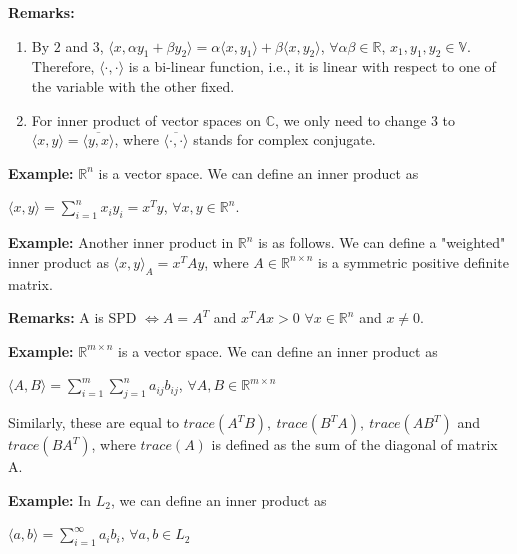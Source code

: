\documentclass{article}
\begin{document}
\textbf{Remarks: } \begin{enumerate}
    \item By $2$ and $3$, $\langle x,\alpha y_1 + \beta y_2\rangle  = \alpha\langle x,y_1\rangle  + \beta\langle x,y_2\rangle $, $\forall \alpha \beta \in \mathbb{R}$, $x_1,y_1,y_2 \in \mathbb{V}$. Therefore, $\langle \cdot,\cdot\rangle $ is a bi-linear function, i.e., it is linear with respect to one of the variable with the other fixed. 
      \item For inner product of vector spaces on $\mathbb{C}$, we only need to change $3$ to $\langle x,y\rangle  = \overline{\langle y,x \rangle }$, where $\overline{\langle \cdot, \cdot \rangle }$ stands for complex conjugate.
\end{enumerate}

    

\textbf{Example:} $\mathbb{R}^{n}$ is a vector space. We can define an inner product as 
    \begin{center}
        $\langle x,y\rangle  = \sum_{i=1}^{n} x_i y_i = x^Ty$, $\forall x,y \in \mathbb{R}^{n}$.
      \end{center}

\bigbreak

\textbf{Example:} Another inner product in $\mathbb{R}^{n}$ is as follows. We can define a "weighted" inner product as $\langle x,y\rangle _A = x^TAy$, where $A \in \mathbb{R}^{n \times n}$ is a symmetric positive definite matrix. 

\textbf{Remarks:} A is SPD $\iff A = A^T$ and $x^TAx >  0$ $\forall x \in \mathbb{R}^{n}$ and $x \neq 0$.

\bigbreak

\textbf{Example:} $\mathbb{R}^{m \times n}$ is a vector space. We can define an inner product as 
    \begin{center}
        $\langle A,B\rangle  = \sum_{i=1}^{m} \sum_{j=1}^{n} a_{ij}b_{ij}$, $\forall A,B \in \mathbb{R}^{m \times n}$ \\
    \end{center}
    \bigbreak
        Similarly, these are equal to $trace(A^TB),\ trace(B^TA),\ trace(AB^T) $ and $trace(BA^T)$, where $trace(A)$ is defined as the sum of the diagonal of matrix A. 

\bigbreak
\textbf{Example:} In $L_2$, we can define an inner product as \\
    \begin{center}
        $\langle a,b\rangle  = \sum_{i=1}^{\infty} a_i b_i$, $\forall a,b \in L_2$
    \end{center}
\end{document}
